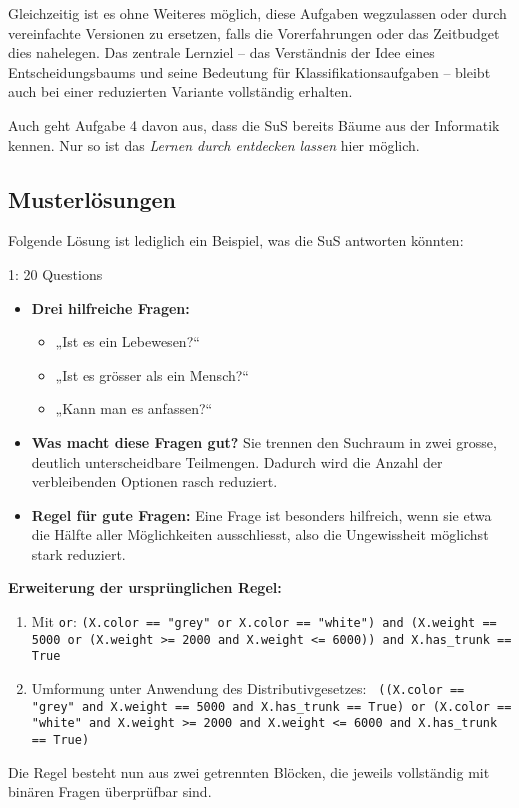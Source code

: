 Gleichzeitig ist es ohne Weiteres möglich, diese Aufgaben wegzulassen oder durch vereinfachte Versionen zu ersetzen, falls die Vorerfahrungen oder das Zeitbudget dies nahelegen. Das zentrale Lernziel – das Verständnis der Idee eines Entscheidungsbaums und seine Bedeutung für Klassifikationsaufgaben – bleibt auch bei einer reduzierten Variante vollständig erhalten.

Auch geht Aufgabe 4 davon aus, dass die SuS bereits Bäume aus der Informatik kennen. Nur so ist das \textit{Lernen durch entdecken lassen} hier möglich.

\subsection*{Musterlösungen}

Folgende Lösung ist lediglich ein Beispiel, was die SuS antworten könnten:
\begin{aufgabe}{1: 20 Questions}
\begin{itemize}
\item \textbf{Drei hilfreiche Fragen:}
\begin{itemize}
\item „Ist es ein Lebewesen?“
\item „Ist es grösser als ein Mensch?“
\item „Kann man es anfassen?“
\end{itemize}

\item \textbf{Was macht diese Fragen gut?}
Sie trennen den Suchraum in zwei grosse, deutlich unterscheidbare Teilmengen. Dadurch wird die Anzahl der verbleibenden Optionen rasch reduziert.

\item \textbf{Regel für gute Fragen:}
Eine Frage ist besonders hilfreich, wenn sie etwa die Hälfte aller Möglichkeiten ausschliesst, also die Ungewissheit möglichst stark reduziert.
\end{itemize}
\end{aufgabe}


\begin{aufgabe}{2}
\textbf{Erweiterung der ursprünglichen Regel:}

\begin{enumerate}
\item Mit \texttt{or}: \texttt{(X.color == "grey"\ or X.color == "white") and (X.weight == 5000 or (X.weight >= 2000 and X.weight <= 6000)) and X.has\_trunk == True}

\item Umformung unter Anwendung des Distributivgesetzes: \texttt{
((X.color == "grey"\ and X.weight == 5000 and X.has\_trunk == True)\
or (X.color == "white" and X.weight >= 2000 and X.weight <= 6000 and X.has\_trunk == True)
}
\end{enumerate}

Die Regel besteht nun aus zwei getrennten Blöcken, die jeweils vollständig mit binären Fragen überprüfbar sind.
\end{aufgabe}

